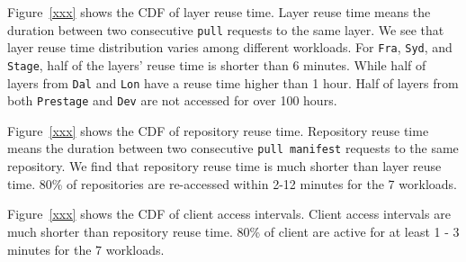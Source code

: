 Figure~\ref{xxx} shows the CDF of layer reuse time. 
Layer reuse time means the duration between two consecutive \texttt{pull} requests to the same layer.
We see that layer reuse time distribution varies among different workloads.
For \texttt{Fra}, \texttt{Syd}, and \texttt{Stage},
half of the layers' reuse time is shorter than 6 minutes.
While half of layers from \texttt{Dal} and \texttt{Lon} have a reuse time higher than 1 hour.
Half of layers from both \texttt{Prestage} and \texttt{Dev} are not accessed for over 100 hours.

Figure~\ref{xxx} shows the CDF of repository reuse time.
Repository reuse time means the duration between two consecutive \texttt{pull manifest} requests to the same repository.
We find that repository reuse time is much shorter than layer reuse time.
80\% of repositories are re-accessed within 2-12 minutes for the 7 workloads.

Figure~\ref{xxx} shows the CDF of client access intervals.
Client access intervals are much shorter than repository reuse time.
80\% of client are active for at least 1 - 3 minutes for the 7 workloads. 




